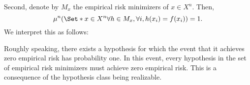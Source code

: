 Second, denote by $M_x$ the empirical risk minimizers of $x \in X^n$.
Then,
    \[
\mu ^n(\Set*{x \in X^n}{\forall h \in M_x, \forall i, h(x_i) = f(x_i)}) = 1.
    \]
We interpret this as follows: 

Roughly speaking, there exists a hypothesis for which the event that it achieves zero empirical risk has probability one.
In this event, every hypothesis in the set of empirical risk minimizers must achieve zero empirical risk.
This is a consequence of the hypothesis class being realizable.

